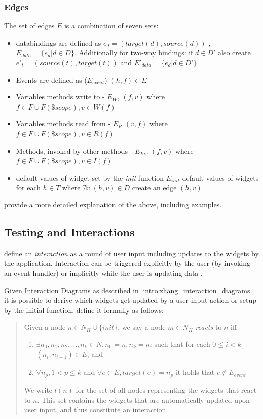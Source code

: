 \subsubsection{Edges}
The set of edges $E$ is a combination of seven sets:

\begin{itemize}
  \item \glspl{databinding} are defined as $e_d = (target(d),source(d))$ , $E_{data} = \{e_d |  d \in D \}$. Additionally for two-way bindings: if $d \in D'$ also create $e'_t = (source(t),target(t))$ and $E'_{data} = \{e_d |  d \in D' \}$
\item Events are defined as ($E_{event}$) $(h,f) \in E$
\item Variables methods write to - $E_{W}$, $(f,v)$ where $f \in F \cup F(\$scope), v \in W(f)$
\item Variables methods read from - $E_{R}$ $(v,f)$ where $f \in F \cup F(\$scope), v \in R(f)$
\item Methods, invoked by other methods - $E_{Inv}$ $(f,v)$ where $f \in F \cup F(\$scope), v \in I(f)$
\item  default values of widget set by the \textit{init} function
$E_{init}$ default values of widgets 
for each $h \in T $ where $ \nexists v | (h,v) \in D$ create an edge $(h,v)$ 
\end{itemize}
\textcite[9]{zhang2019scenario} provide a more detailed explanation of the above, including examples.
 

\subsection{Testing and Interactions}
\textcite{zhang2019scenario} define an \textit{interaction} as a round of user input including updates to the widgets by the application. Interaction can be triggered explicitly by the user (by invoking an event handler) or implicitly while the user is updating data \parencite{zhang2019scenario}.

Given Interaction Diagrams as described in \ref{intro:zhang_interaction_diagrams}, it is possible to derive which widgets get updated by a user input action or setup by the initial function. \textcite{zhang2019scenario} define it formally as follows:
\begin{quote}
\label{quote:interactions}
Given a node $n \in N_H \cup \{init\}$, we say a node $m \in N_H$ \textit{reacts} to $n$ iff
  \begin{enumerate}
      \item $\exists n_0,n_1,n_2, \ldots,n_k \in N, n_0=n,n_k=m$ such that for each $0 \leq i < k  $ $(n_i,n_{i+1}) \in E$, and 
      \item $\forall n_p, 1 < p \leq k$ and $\forall e \in E, target(e)= n_p$ it holds that $e \notin E_{event}$  
  \end{enumerate}
  We write $l(n)$ for the set of all nodes representing the widgets that react to $n$. This set contains the widgets that are automatically updated upon user input,
  and thus constitute an interaction.
  \end{quote}

